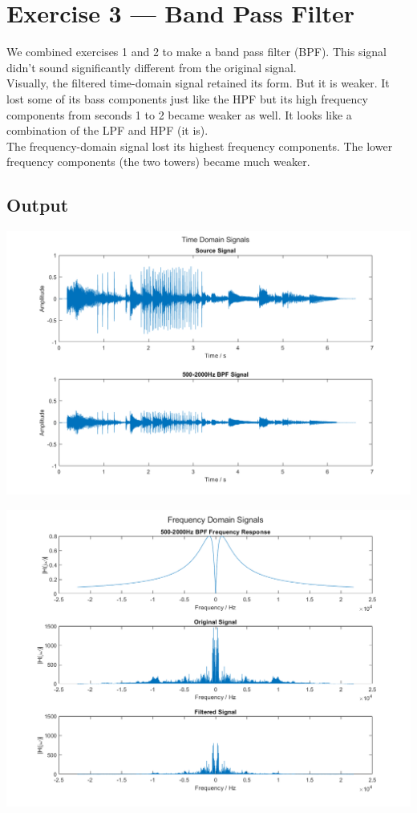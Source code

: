 \documentclass[11pt]{article}
\begin{document}


\section{Exercise 3 --- Band Pass Filter}

We combined exercises 1 and 2 to make a band pass filter (BPF).
This signal didn't sound significantly different from the original 
signal.\\

Visually, the filtered time-domain signal retained its form. 
But it is weaker. It lost some of its bass components just
like the HPF but its high frequency components from seconds 1 to 2
became weaker as well. It looks like a combination of the LPF and HPF
(it is).\\

The frequency-domain signal lost its highest frequency components.
The lower frequency components (the two towers) became much weaker. 

\subsection{Output}

\includegraphics[width=\textwidth]{bpf_time.png}

\includegraphics[width=\textwidth]{bpf_frequency.png}
\end{document}
